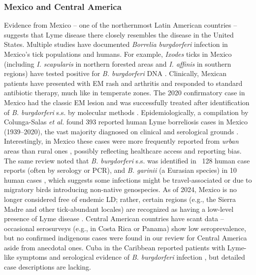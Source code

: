 \documentclass[11pt,letterpaper]{article}
\begin{document}
\subsubsection{Mexico and Central America}
Evidence from Mexico – one of the northernmost Latin American countries – suggests that Lyme disease there closely resembles the disease in the United States. Multiple studies have documented \textit{Borrelia burgdorferi} infection in Mexico’s tick populations and humans. For example, \textit{Ixodes} ticks in Mexico (including \textit{I. scapularis} in northern forested areas and \textit{I. affinis} in southern regions) have tested positive for \textit{B. burgdorferi} DNA \citep{Lucca2024j}. Clinically, Mexican patients have presented with EM rash and arthritis and responded to standard antibiotic therapy, much like in temperate zones. The 2020 confirmatory case in Mexico had the classic EM lesion and was successfully treated after identification of \textit{B. burgdorferi} s.s. by molecular methods \citep{Colunga-Salas2020f}. Epidemiologically, a compilation by Colunga-Salas \textit{et al.} found 393 reported human Lyme borreliosis cases in Mexico (1939–2020), the vast majority diagnosed on clinical and serological grounds \citep{Colunga-Salas2020g}. Interestingly, in Mexico these cases were more frequently reported from \textit{urban} areas than rural ones \citep{Colunga-Salas2020h}, possibly reflecting healthcare access and reporting bias. The same review noted that \textit{B. burgdorferi} s.s. was identified in ~128 human case reports (often by serology or PCR), and \textit{B. garinii} (a Eurasian species) in 10 human cases \citep{Colunga-Salas2020i}, which suggests some infections might be travel-associated or due to migratory birds introducing non-native genospecies. As of 2024, Mexico is no longer considered free of endemic LD; rather, certain regions (e.g., the Sierra Madre and other tick-abundant locales) are recognized as having a low-level presence of Lyme disease \citep{Colunga-Salas2020j, Colunga-Salas2020k}. Central American countries have scant data – occasional serosurveys (e.g., in Costa Rica or Panama) show low seroprevalence, but no confirmed indigenous cases were found in our review for Central America aside from anecdotal ones. Cuba in the Caribbean reported patients with Lyme-like symptoms and serological evidence of \textit{B. burgdorferi} infection \citep{Lucca2024k}, but detailed case descriptions are lacking.
\end{document}
